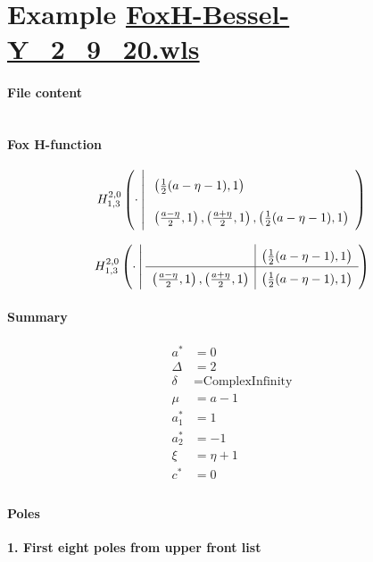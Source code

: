 \documentclass[11pt]{article}
\begin{document}
\section{Example \url{FoxH-Bessel-Y_2_9_20.wls}}

\paragraph{File content}

\inputminted{text}{FoxH-Bessel-Y_2_9_20.wls}

\paragraph{Fox H-function}

\begin{align*}
  \FoxH
    {2,0}
    {1,3}
    {\cdot}
    {\left(\frac{1}{2} (a-\eta -1), 1\right)}
    {\left(\frac{a-\eta }{2}, 1\right), \left(\frac{a+\eta }{2}, 1\right), \left(\frac{1}{2} (a-\eta -1), 1\right)}
\end{align*}

\begin{align*}
  \FoxHext
    {2,0}
    {1,3}
    {\cdot}
    {}
    {\left(\frac{1}{2} (a-\eta -1), 1\right)}
    {\left(\frac{a-\eta }{2}, 1\right), \left(\frac{a+\eta }{2}, 1\right)}
    {\left(\frac{1}{2} (a-\eta -1), 1\right)}
\end{align*}

\paragraph{Summary}

\begin{align*}
  a^*    & = 0 \\
  \Delta & = 2 \\
  \delta & = \text{ComplexInfinity} \\
  \mu    & = a-1 \\
  a_1^*  & = 1 \\
  a_2^*  & = -1 \\
  \xi    & = \eta +1 \\
  c^*    & = 0 \\
\end{align*}

\paragraph{Poles}

\noindent\textbf{1. First eight poles from upper front list}
\end{document}

